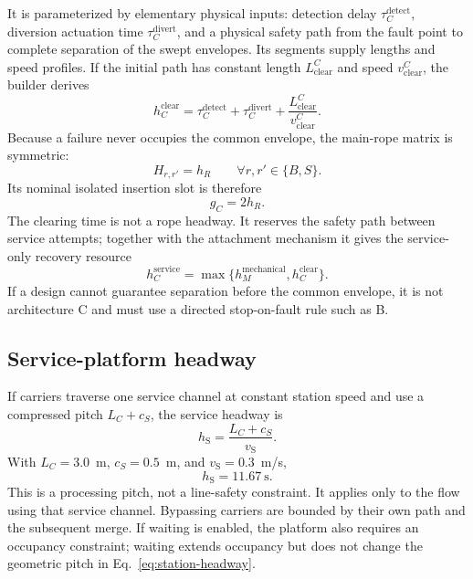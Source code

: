 \documentclass[11pt,a4paper]{scrartcl}
\newcommand{\vstation}{v_{\mathrm S}}
\newcommand{\hservice}{h_{\mathrm S}}
\begin{document}
It is parameterized by elementary physical inputs: detection delay
$\tau_C^{\mathrm{detect}}$, diversion actuation time
$\tau_C^{\mathrm{divert}}$, and a physical safety path from the fault point to
complete separation of the swept envelopes.  Its segments supply lengths and
speed profiles.  If the initial path has constant length
$L_{\mathrm{clear}}^C$ and speed $v_{\mathrm{clear}}^C$, the builder derives
\begin{equation}
h_C^{\mathrm{clear}}
=\tau_C^{\mathrm{detect}}+\tau_C^{\mathrm{divert}}
 +\frac{L_{\mathrm{clear}}^C}{v_{\mathrm{clear}}^C}.
\label{eq:architecture-c-clear}
\end{equation}
Because a failure never occupies the common envelope, the main-rope matrix is
symmetric:
\begin{equation}
H_{r,r'}=h_R\qquad\forall r,r'\in\{B,S\}.
\label{eq:architecture-c}
\end{equation}
Its nominal isolated insertion slot is therefore
\begin{equation}
g_C=2h_R.
\label{eq:architecture-c-slot}
\end{equation}
The clearing time is not a rope headway.  It reserves the safety path between
service attempts; together with the attachment mechanism it gives the
service-only recovery resource
\begin{equation}
h_C^{\mathrm{service}}=\max\{h_M^{\mathrm{mechanical}},
h_C^{\mathrm{clear}}\}.
\label{eq:architecture-c-service}
\end{equation}
If a design cannot guarantee separation before the common envelope, it is not
architecture C and must use a directed stop-on-fault rule such as B.

\subsection{Service-platform headway}

If carriers traverse one service channel at constant station speed and use a
compressed pitch $L_C+c_S$, the service headway is
\begin{equation}
\hservice=\frac{L_C+c_S}{\vstation}.
\label{eq:station-headway}
\end{equation}
With $L_C=3.0$~m, $c_S=0.5$~m, and $\vstation=0.3$~m/s,
\[
\hservice=11.67\ \mathrm s.
\]
This is a processing pitch, not a line-safety constraint.  It applies only to
the flow using that service channel.  Bypassing carriers are bounded by their
own path and the subsequent merge.  If waiting is enabled, the platform also
requires an occupancy constraint; waiting extends occupancy but does not change
the geometric pitch in Eq.~\eqref{eq:station-headway}.
\end{document}
